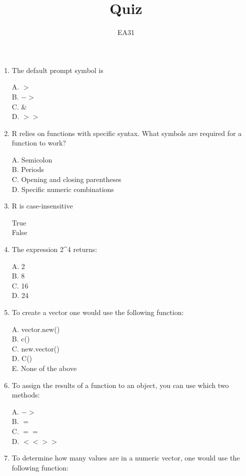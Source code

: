 \documentclass[12pt]{article}\usepackage[]{graphicx}\usepackage[]{color}
\title{Quiz}
\author{EA31}
\begin{document}
\maketitle

\begin{enumerate}

\item The default prompt symbol is 

A. $>$\\
B. $->$ \\
C. $\&$ \\
D. $>>$ 

\item R relies on functions with specific syntax. What symbols are required for a function to work?

A. Semicolon \\
B. Periods \\ 
C. Opening and closing parentheses \\
D. Specific numeric combinations \\

\item R is case-insensitive

True \\
False \\

\item The expression 2\^{}4 returns:

A. 2 \\
B. 8 \\
C. 16 \\
D. 24 \\

\item To create a vector one would use the following function:

A. vector.new() \\
B. c() \\
C. new.vector() \\
D. C() \\
E. None of the above 

\item To assign the results of a function to an object, you can use which two methods:

A. $->$ \\
B. $=$ \\
C. $==$ \\
D. $<<>>$ \\

\item To determine how many values are in a numeric vector, one would use the following function: 


\end{enumerate}
\end{document}

